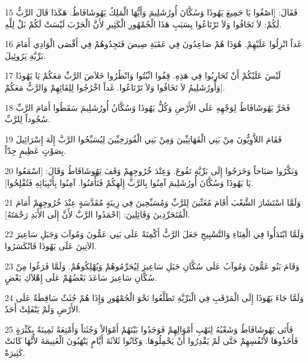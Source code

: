 \par 15 فَقَالَ: [اصْغُوا يَا جَمِيعَ يَهُوذَا وَسُكَّانَ أُورُشَلِيمَ وَأَيُّهَا الْمَلِكُ يَهُوشَافَاطُ. هَكَذَا قَالَ الرَّبُّ لَكُمْ: لاَ تَخَافُوا وَلاَ تَرْتَاعُوا بِسَبَبِ هَذَا الْجُمْهُورِ الْكَثِيرِ لأَنَّ الْحَرْبَ لَيْسَتْ لَكُمْ بَلْ لِلَّهِ.
\par 16 غَداً انْزِلُوا عَلَيْهِمْ. هُوَذَا هُمْ صَاعِدُونَ فِي عَقَبَةِ صِيصَ فَتَجِدُوهُمْ فِي أَقْصَى الْوَادِي أَمَامَ بَرِّيَّةِ يَرُوئِيلَ.
\par 17 لَيْسَ عَلَيْكُمْ أَنْ تُحَارِبُوا فِي هَذِهِ. قِفُوا اثْبُتُوا وَانْظُرُوا خَلاَصَ الرَّبِّ مَعَكُمْ يَا يَهُوذَا وَأُورُشَلِيمُ لاَ تَخَافُوا وَلاَ تَرْتَاعُوا. غَداً اخْرُجُوا لِلِقَائِهِمْ وَالرَّبُّ مَعَكُمْ].
\par 18 فَخَرَّ يَهُوشَافَاطُ لِوَجْهِهِ عَلَى الأَرْضِ وَكُلُّ يَهُوذَا وَسُكَّانُ أُورُشَلِيمَ سَقَطُوا أَمَامَ الرَّبِّ سُجُوداً لِلرَّبِّ.
\par 19 فَقَامَ اللاَّوِيُّونَ مِنْ بَنِي الْقَهَاتِيِّينَ وَمِنْ بَنِي الْقُورَحِيِّينَ لِيُسَبِّحُوا الرَّبَّ إِلَهَ إِسْرَائِيلَ بِصَوْتٍ عَظِيمٍ جِدّاً.
\par 20 وَبَكَّرُوا صَبَاحاً وَخَرَجُوا إِلَى بَرِّيَّةِ تَقُوعَ. وَعِنْدَ خُرُوجِهِمْ وَقَفَ يَهُوشَافَاطُ وَقَالَ: [اسْمَعُوا يَا يَهُوذَا وَسُكَّانَ أُورُشَلِيمَ آمِنُوا بِالرَّبِّ إِلَهِكُمْ فَتَأْمَنُوا. آمِنُوا بِأَنْبِيَائِهِ فَتُفْلِحُوا].
\par 21 وَلَمَّا اسْتَشَارَ الشَّعْبَ أَقَامَ مُغَنِّينَ لِلرَّبِّ وَمُسَبِّحِينَ فِي زِينَةٍ مُقَدَّسَةٍ عِنْدَ خُرُوجِهِمْ أَمَامَ الْمُتَجَرِّدِينَ وَقَائِلِينَ: [احْمَدُوا الرَّبَّ لأَنَّ إِلَى الأَبَدِ رَحْمَتَهُ].
\par 22 وَلَمَّا ابْتَدَأُوا فِي الْغِنَاءِ وَالتَّسْبِيحِ جَعَلَ الرَّبُّ أَكْمِنَةً عَلَى بَنِي عَمُّونَ وَمُوآبَ وَجَبَلِ سَاعِيرَ الآتِينَ عَلَى يَهُوذَا فَانْكَسَرُوا.
\par 23 وَقَامَ بَنُو عَمُّونَ وَمُوآبُ عَلَى سُكَّانِ جَبَلِ سَاعِيرَ لِيُحَرِّمُوهُمْ وَيُهْلِكُوهُمْ. وَلَمَّا فَرَغُوا مِنْ سُكَّانِ سَاعِيرَ سَاعَدَ بَعْضُهُمْ عَلَى إِهْلاَكِ بَعْضٍ.
\par 24 وَلَمَّا جَاءَ يَهُوذَا إِلَى الْمَرْقَبِ فِي الْبَرِّيَّةِ تَطَلَّعُوا نَحْوَ الْجُمْهُورِ وَإِذَا هُمْ جُثَثٌ سَاقِطَةٌ عَلَى الأَرْضِ وَلَمْ يَنْفَلِتْ أَحَدٌ.
\par 25 فَأَتَى يَهُوشَافَاطُ وَشَعْبُهُ لِنَهْبِ أَمْوَالِهِمْ فَوَجَدُوا بَيْنَهُمْ أَمْوَالاً وَجُثَثاً وَأَمْتِعَةً ثَمِينَةً بِكَثْرَةٍ فَأَخَذُوهَا لأَنْفُسِهِمْ حَتَّى لَمْ يَقْدِرُوا أَنْ يَحْمِلُوهَا. وَكَانُوا ثَلاَثَةَ أَيَّامٍ يَنْهَبُونَ الْغَنِيمَةَ لأَنَّهَا كَانَتْ كَثِيرَةً.
